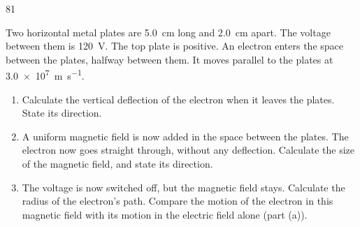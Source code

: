 \begin{practiceq}{8}{1}\label{pq:crossed}
\begin{sidebyside}[0.46]
  \centering
\nextside
Two horizontal metal plates are \qty{5.0}{cm} long and \qty{2.0}{cm} apart. The voltage
between them is \qty{120}{V}. The top plate is positive. An electron enters the space
between the plates, halfway between them. It moves parallel to the plates at
\qty{3.0e7}{m.s^{-1}}.
\end{sidebyside}
\begin{enumerate}[label=(\alph*)]
  \item Calculate the vertical deflection of the electron when it leaves the plates. State
        its direction. 
  \item A uniform magnetic field is now added in the space between the plates. The electron
        now goes straight through, without any deflection. Calculate the size of the
        magnetic field, and state its direction. 
  \item The voltage is now switched off, but the magnetic field stays. Calculate the radius
        of the electron's path. Compare the motion of the electron in this magnetic field
        with its motion in the electric field alone (part (a)). 
\end{enumerate}
\end{practiceq}
